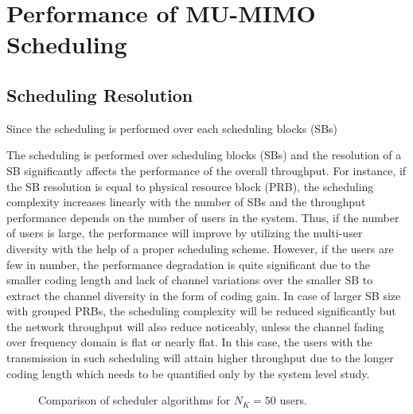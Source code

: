 \documentclass[conference,letterpaper,10pt]{./../../IEEE/IEEEtran}
\begin{document}
\section{Performance of MU-MIMO Scheduling}
\label{sec:perf_scheduling}
\subsection{Scheduling Resolution}
Since the scheduling is performed over each scheduling blocks (SBs)

The scheduling is performed over scheduling blocks (SBs) and the resolution of a SB significantly affects the performance of the overall throughput. For instance, if the SB resolution is equal to physical resource block (PRB), the scheduling complexity increases linearly with the number of SBs and the throughput performance depends on the number of users in the system. Thus, if the number of users is large, the performance will improve by utilizing the multi-user diversity with the help of a proper scheduling scheme. However, if the users are few in number, the performance degradation is quite significant due to the smaller coding length and lack of channel variations over the smaller SB to extract the channel diversity in the form of coding gain. In case of larger SB size with grouped PRBs, the scheduling complexity will be reduced significantly but the network throughput will also reduce noticeably, unless the channel fading over frequency domain is flat or nearly flat. In this case, the users with the transmission in such scheduling will attain higher throughput due to the longer coding length which needs to be quantified only by the system level study.
\begin{figure}
\centering
\caption{Comparison of scheduler algorithms for $N_K = 50$ users.}
\label{kuva:performance_plot}
 \vspace{-0.15in}
\end{figure}
\end{document}
